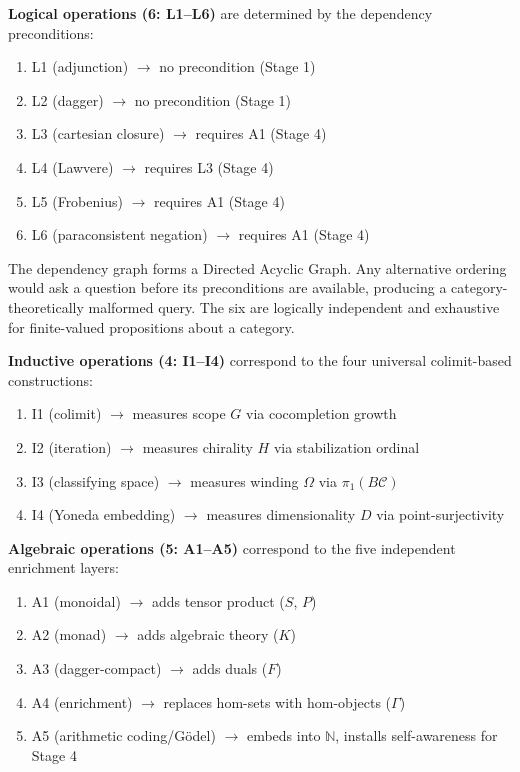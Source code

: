\documentclass[12pt,a4paper]{article}
\begin{document}
\textbf{Logical operations (6: L1--L6)} are determined by the dependency preconditions:
\begin{enumerate}
    \item L1 (adjunction) $\to$ no precondition (Stage 1)
    \item L2 (dagger) $\to$ no precondition (Stage 1)
    \item L3 (cartesian closure) $\to$ requires A1 (Stage 4)
    \item L4 (Lawvere) $\to$ requires L3 (Stage 4)
    \item L5 (Frobenius) $\to$ requires A1 (Stage 4)
    \item L6 (paraconsistent negation) $\to$ requires A1 (Stage 4)
\end{enumerate}

The dependency graph forms a Directed Acyclic Graph. Any alternative ordering would ask a question before its preconditions are available, producing a category-theoretically malformed query. The six are logically independent and exhaustive for finite-valued propositions about a category.

\textbf{Inductive operations (4: I1--I4)} correspond to the four universal colimit-based constructions:
\begin{enumerate}
    \item I1 (colimit) $\to$ measures scope $G$ via cocompletion growth
    \item I2 (iteration) $\to$ measures chirality $H$ via stabilization ordinal
    \item I3 (classifying space) $\to$ measures winding $\Omega$ via $\pi_1(B\mathcal{C})$
    \item I4 (Yoneda embedding) $\to$ measures dimensionality $D$ via point-surjectivity
\end{enumerate}

\textbf{Algebraic operations (5: A1--A5)} correspond to the five independent enrichment layers:
\begin{enumerate}
    \item A1 (monoidal) $\to$ adds tensor product ($S$, $P$)
    \item A2 (monad) $\to$ adds algebraic theory ($K$)
    \item A3 (dagger-compact) $\to$ adds duals ($F$)
    \item A4 (enrichment) $\to$ replaces hom-sets with hom-objects ($\Gamma$)
    \item A5 (arithmetic coding/G\"odel) $\to$ embeds into $\mathbb{N}$, installs self-awareness for Stage 4
\end{enumerate}
\end{document}
